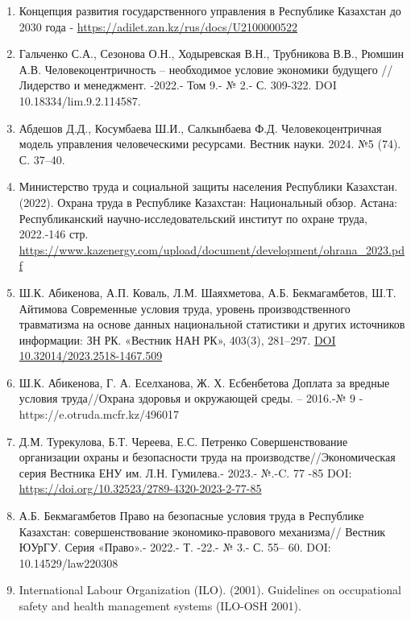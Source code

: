 \begin{references}

\begin{enumerate}
\def\labelenumi{\arabic{enumi}.}
\item
  Концепция развития государственного управления в Республике Казахстан
  до 2030 года - \url{https://adilet.zan.kz/rus/docs/U2100000522}
\item
  Гальченко С.А., Сезонова О.Н., Ходыревская В.Н., Трубникова В.В.,
  Рюмшин А.В. Человекоцентричность -- необходимое условие экономики
  будущего // Лидерство и менеджмент. -2022.- Том 9.- № 2.- С. 309-322.
  DOI 10.18334/lim.9.2.114587.
\item
  Абдешов Д.Д., Косумбаева Ш.И., Салкынбаева Ф.Д. Человекоцентричная
  модель управления человеческими ресурсами. Вестник науки. 2024. №5
  (74). С. 37--40.
\item
  Министерство труда и социальной защиты населения Республики Казахстан.
  (2022). Охрана труда в Республике Казахстан: Национальный обзор.
  Астана: Республиканский научно-исследовательский институт по охране
  труда, 2022.-146 стр.
  \url{https://www.kazenergy.com/upload/document/development/ohrana_2023.pdf}
\item
  Ш.К. Абикенова, А.П. Коваль, Л.М. Шаяхметова, А.Б. Бекмагамбетов, Ш.Т.
  Айтимова Современные условия труда, уровень производственного
  травматизма на основе данных национальной статистики и других
  источников информации: ЗН РК. «Вестник НАН РК», 403(3), 281--297.
  \href{https://doi.org/10.32014/2023.2518-1467.509}{DOI
  10.32014/2023.2518-1467.509}
\item
  Ш.К. Абикенова, Г. А. Еселханова, Ж. Х. Есбенбетова Доплата за вредные
  условия труда//Охрана здоровья и окружающей среды. -- 2016.-№ 9 -
  https://e.otruda.mcfr.kz/496017
\item
  Д.М. Турекулова, Б.Т. Череева, Е.С. Петренко Совершенствование
  организации охраны и безопасности труда на производстве//Экономическая
  серия Вестника ЕНУ им. Л.Н. Гумилева.- 2023.- №.-C. 77 -85 DOI:
  \url{https://doi.org/10.32523/2789-4320-2023-2-77-85}
\item
  А.Б. Бекмагамбетов Право на безопасные условия труда в Республике
  Казахстан: совершенствование экономико-правового механизма// Вестник
  ЮУрГУ. Серия «Право».- 2022.- Т. -22.- № 3.- С. 55-- 60. DOI:
  10.14529/law220308
\item
  International Labour Organization (ILO). (2001). Guidelines on
  occupational safety and health management systems (ILO-OSH 2001).

\end{enumerate}
\end{references}
